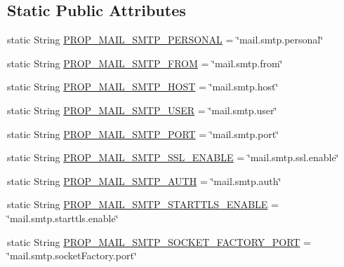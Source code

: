 \subsection*{Static Public Attributes}
\begin{DoxyCompactItemize}
\item 
static String \hyperlink{classbr_1_1usp_1_1cata_1_1service_1_1_email_service_a9ef4bbbf02c68df3bc44cbb5272048b9}{P\+R\+O\+P\+\_\+\+M\+A\+I\+L\+\_\+\+S\+M\+T\+P\+\_\+\+P\+E\+R\+S\+O\+N\+A\+L} = \char`\"{}mail.\+smtp.\+personal\char`\"{}
\item 
static String \hyperlink{classbr_1_1usp_1_1cata_1_1service_1_1_email_service_ad664b2ea4e98b5aca9a5a57998a6a652}{P\+R\+O\+P\+\_\+\+M\+A\+I\+L\+\_\+\+S\+M\+T\+P\+\_\+\+F\+R\+O\+M} = \char`\"{}mail.\+smtp.\+from\char`\"{}
\item 
static String \hyperlink{classbr_1_1usp_1_1cata_1_1service_1_1_email_service_a281866e958ed8d604c7652584b276896}{P\+R\+O\+P\+\_\+\+M\+A\+I\+L\+\_\+\+S\+M\+T\+P\+\_\+\+H\+O\+S\+T} = \char`\"{}mail.\+smtp.\+host\char`\"{}
\item 
static String \hyperlink{classbr_1_1usp_1_1cata_1_1service_1_1_email_service_adaaba7639ca5fb8e2397c7f75ce0ad36}{P\+R\+O\+P\+\_\+\+M\+A\+I\+L\+\_\+\+S\+M\+T\+P\+\_\+\+U\+S\+E\+R} = \char`\"{}mail.\+smtp.\+user\char`\"{}
\item 
static String \hyperlink{classbr_1_1usp_1_1cata_1_1service_1_1_email_service_a781d850c1d19164ce8dcbb9a83a3860a}{P\+R\+O\+P\+\_\+\+M\+A\+I\+L\+\_\+\+S\+M\+T\+P\+\_\+\+P\+O\+R\+T} = \char`\"{}mail.\+smtp.\+port\char`\"{}
\item 
static String \hyperlink{classbr_1_1usp_1_1cata_1_1service_1_1_email_service_a398b3e3a794b2742e0a2125c1256aa4e}{P\+R\+O\+P\+\_\+\+M\+A\+I\+L\+\_\+\+S\+M\+T\+P\+\_\+\+S\+S\+L\+\_\+\+E\+N\+A\+B\+L\+E} = \char`\"{}mail.\+smtp.\+ssl.\+enable\char`\"{}
\item 
static String \hyperlink{classbr_1_1usp_1_1cata_1_1service_1_1_email_service_af4581e560903f13da9b67582e061d743}{P\+R\+O\+P\+\_\+\+M\+A\+I\+L\+\_\+\+S\+M\+T\+P\+\_\+\+A\+U\+T\+H} = \char`\"{}mail.\+smtp.\+auth\char`\"{}
\item 
static String \hyperlink{classbr_1_1usp_1_1cata_1_1service_1_1_email_service_af20a1de38a7c761f3073d0fae020d642}{P\+R\+O\+P\+\_\+\+M\+A\+I\+L\+\_\+\+S\+M\+T\+P\+\_\+\+S\+T\+A\+R\+T\+T\+L\+S\+\_\+\+E\+N\+A\+B\+L\+E} = \char`\"{}mail.\+smtp.\+starttls.\+enable\char`\"{}
\item 
static String \hyperlink{classbr_1_1usp_1_1cata_1_1service_1_1_email_service_a781af3f937dc7e8f8b0dd19c909e8881}{P\+R\+O\+P\+\_\+\+M\+A\+I\+L\+\_\+\+S\+M\+T\+P\+\_\+\+S\+O\+C\+K\+E\+T\+\_\+\+F\+A\+C\+T\+O\+R\+Y\+\_\+\+P\+O\+R\+T} = \char`\"{}mail.\+smtp.\+socket\+Factory.\+port\char`\"{}
\end{DoxyCompactItemize}
